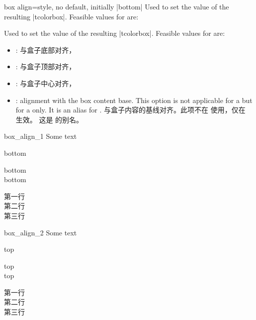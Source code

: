 \begin{docTcbKey}[][doc new=2014-10-10]{box align}{=}{style, no default, initially |bottom|}
Used to set the  value of the resulting |tcolorbox|.
Feasible values for  are:

Used to set the  value of the resulting |tcolorbox|.
Feasible values for  are:  
\begin{itemize}
\item{}: %
与盒子底部对齐，
\item{}: %
与盒子顶部对齐，
\item{}: %
与盒子中心对齐，
\item{}: 
alignment with the box content base. This option
is not applicable for a  but for a  only.
It is an alias for .
与盒子内容的基线对齐。此项不在  使用，仅在  生效。
这是  的别名。
\end{itemize}

\begin{exdispExample}{box_align_1}
Some text\dotfill
\begin{tcolorbox}[box align=bottom]
bottom
\end{tcolorbox}
\begin{tcolorbox}[box align=bottom]
bottom\\bottom
\end{tcolorbox}
\begin{tcolorbox}
第一行\\第二行\\第三行
\end{tcolorbox}
\end{exdispExample}

\begin{exdispExample}{box_align_2}
Some text\dotfill
\begin{tcolorbox}[box align=top]
top
\end{tcolorbox}
\begin{tcolorbox}[box align=top]
top\\top
\end{tcolorbox}
\begin{tcolorbox}
第一行\\第二行\\第三行
\end{tcolorbox}
\end{exdispExample}


\end{docTcbKey}
